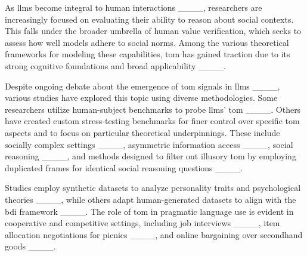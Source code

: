 As \acp{llm} become integral to human interactions ____, researchers are increasingly focused on evaluating their ability to reason about social contexts. This falls under the broader umbrella of human value verification, which seeks to assess how well models adhere to social norms. Among the various theoretical frameworks for modeling these capabilities, \ac{tom} has gained traction due to its strong cognitive foundations and broad applicability ____. 


Despite ongoing debate about the emergence of \ac{tom} signals in \acp{llm} ____, various studies have explored this topic using diverse methodologies. Some researchers utilize human-subject benchmarks to probe \acp{llm}' \ac{tom} ____.  Others have created custom stress-testing benchmarks for finer control over specific \ac{tom} aspects and to focus on particular theoretical underpinnings. These include socially complex settings ____, asymmetric information access ____, social reasoning ____, and methods designed to filter out illusory \ac{tom} by employing duplicated frames for identical social reasoning questions ____.


Studies employ synthetic datasets to analyze personality traits and psychological theories ____, while others adapt human-generated datasets to align with the \ac{bdi} framework ____. The role of \ac{tom} in pragmatic language use is evident in cooperative and competitive settings, including job interviews ____, item allocation negotiations for picnics ____, and online bargaining over secondhand goods ____.